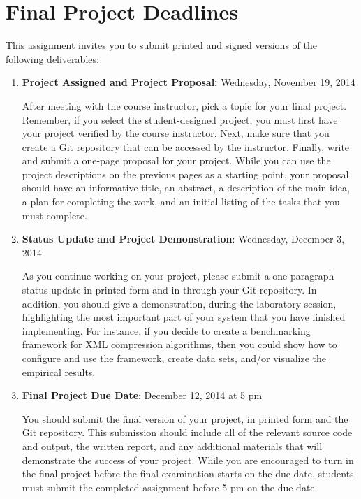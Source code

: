 \section*{Final Project Deadlines}

This assignment invites you to submit printed and signed versions of the following deliverables: 

\vspace*{-.05in}
\begin{enumerate}

  \itemsep0in

  \item {\bf Project Assigned and Project Proposal:} Wednesday, November 19, 2014

    After meeting with the course instructor, pick a topic for your final project.  Remember, if you select the
    student-designed project, you must first have your project verified by the course instructor.  Next, make sure that
    you create a Git repository that can be accessed by the instructor. Finally, write and submit a one-page proposal
    for your project. While you can use the project descriptions on the previous pages as a starting point, your
    proposal should have an informative title, an abstract, a description of the main idea, a plan for completing the
    work, and an initial listing of the tasks that you must complete.

  \item {\bf Status Update and Project Demonstration}: Wednesday, December 3, 2014

    As you continue working on your project, please submit a one paragraph status update in printed form and in through
    your Git repository.  In addition, you should give a demonstration, during the laboratory session, highlighting the
    most important part of your system that you have finished implementing. For instance, if you decide to create a
    benchmarking framework for XML compression algorithms, then you could show how to configure and use the framework,
    create data sets, and/or visualize the empirical results.

  \item {\bf Final Project Due Date}: December 12, 2014 at 5 pm

    You should submit the final version of your project, in printed form and the Git repository. This submission should
    include all of the relevant source code and output, the written report, and any additional materials that will
    demonstrate the success of your project.  While you are encouraged to turn in the final project before the final
    examination starts on the due date, students must submit the completed assignment before 5 pm on the due date.

\end{enumerate}
\vspace*{-.05in}

